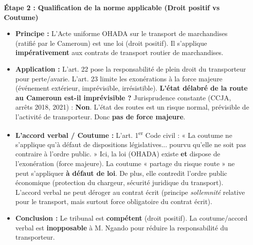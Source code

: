 \documentclass[11pt]{article}
\newcommand{\cle}[1]{{\popxbold\color{popdark}#1}}
\begin{document}
\begin{exoresolu}
\textbf{Étape 2 : Qualification de la norme applicable (Droit positif vs Coutume)}
\begin{itemize}
    \item \textbf{Principe :} L'Acte uniforme OHADA sur le transport de marchandises (ratifié par le Cameroun) est une \cle{loi} (droit positif). Il s'applique \textbf{impérativement} aux contrats de transport routier de marchandises.
    \item \textbf{Application :} L'art. 22 pose la responsabilité de plein droit du transporteur pour perte/avarie. L'art. 23 limite les exonérations à la \cle{force majeure} (événement extérieur, imprévisible, irrésistible). \textbf{L'état délabré de la route au Cameroun est-il imprévisible ?} Jurisprudence constante (CCJA, arrêts 2018, 2021) : \textbf{Non}. L'état des routes est un risque normal, prévisible de l'activité de transporteur. Donc \textbf{pas de force majeure}.
    \item \textbf{L'accord verbal / Coutume :} L'art. 1\textsuperscript{er} Code civil : « La coutume ne s'applique qu'à défaut de dispositions législatives... pourvu qu'elle ne soit pas contraire à l'ordre public. » Ici, la loi (OHADA) existe \textbf{et} dispose de l'exonération (force majeure). La coutume « partage du risque route » ne peut s'appliquer \textbf{à défaut de loi}. De plus, elle contredit l'ordre public économique (protection du chargeur, sécurité juridique du transport). L'accord verbal ne peut déroger au contrat écrit (principe \textit{sollemnité} relative pour le transport, mais surtout force obligatoire du contrat écrit).
    \item \textbf{Conclusion :} Le tribunal est \textbf{compétent} (droit positif). La coutume/accord verbal est \textbf{inopposable} à M. Ngando pour réduire la responsabilité du transporteur.
\end{itemize}


\end{exoresolu}
\end{document}
